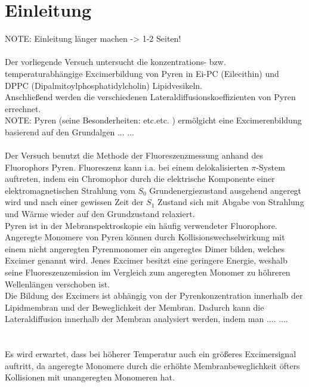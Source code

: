 \pagestyle{headings}
\setcounter{page}{1}

\section{Einleitung}
NOTE: Einleitung länger machen -> 1-2 Seiten! \\\\

Der vorliegende Versuch untersucht die konzentrations- bzw. temperaturabhängige Excimerbildung von Pyren in Ei-PC (Eilecithin) und DPPC (Dipalmitoylphosphatidylcholin) Lipidvesikeln.\\
Anschließend werden die verschiedenen Lateraldiffusionskoeffizienten von Pyren errechnet. \\

NOTE: Pyren (seine Besonderheiten: etc.etc. ) ermölgicht eine Excimerenbildung basierend auf den Grundalgen ... ...
\\\\
Der Versuch benutzt die Methode der Fluoreszenzmessung anhand des Fluorophors Pyren. Fluoreszenz kann i.a. bei einem delokalisierten $\pi$-System auftreten, indem ein Chromophor durch die elektrische Komponente einer elektromagnetischen Strahlung vom $S_0$ Grundenergiezustand ausgehend angeregt wird und nach einer gewissen Zeit der $S_1$ Zustand sich mit Abgabe von Strahlung und Wärme wieder auf den Grundzustand relaxiert.\\
Pyren ist in der Mebranspektroskopie ein häufig verwendeter Fluorophore. Angeregte Monomere von Pyren können durch Kollisionswechselwirkung mit einem nicht angeregten Pyrenmonomer ein angeregtes Dimer bilden, welches Excimer genannt wird. Jenes Excimer besitzt eine geringere Energie,
weshalb seine Fluoreszenzemission im Vergleich zum angeregten Monomer zu höhreren Wellenlängen verschoben ist. \\ Die Bildung des Excimers ist abhängig von der Pyrenkonzentration innerhalb der Lipidmembran und der Beweglichkeit der Membran. Dadurch kann die Lateraldiffusion innerhalb der Membran analysiert werden, indem man .... .... \\\\\\

Es wird erwartet, dass bei höherer Temperatur auch ein größeres Excimersignal auftritt, da angeregte Monomere durch die erhöhte 
Membranbeweglichkeit öfters Kollisionen mit unangeregten Monomeren hat.